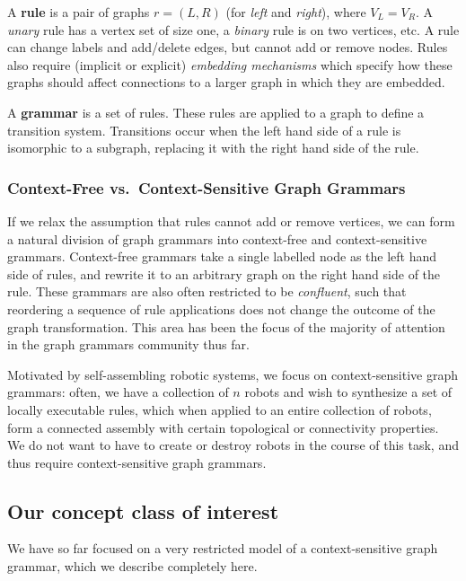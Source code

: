\documentclass[]{article}
\begin{document}
A \textbf{rule} is a pair of graphs \(r=(L,R)\) (for \emph{left} and
\emph{right}), where \(V_L = V_R\). A \emph{unary} rule has a vertex set
of size one, a \emph{binary} rule is on two vertices, etc. A rule can
change labels and add/delete edges, but cannot add or remove nodes.
Rules also require (implicit or explicit) \emph{embedding mechanisms}
which specify how these graphs should affect connections to a larger
graph in which they are embedded.

A \textbf{grammar} is a set of rules. These rules are applied
 to a graph to define a transition system. Transitions occur
when the left hand side of a rule is isomorphic to a subgraph, replacing it 
with the right hand side of the rule.

\subsubsection{Context-Free vs.~Context-Sensitive Graph
Grammars}\label{context-free-vs.context-sensitive-graph-grammars}

If we relax the assumption that rules cannot add or remove vertices, we
can form a natural division of graph grammars into context-free and
context-sensitive grammars. Context-free grammars take a single labelled
node as the left hand side of rules, and rewrite it to an arbitrary graph on
the right hand side of the rule. These grammars are also
often restricted to be \emph{confluent}, such that reordering a
sequence of rule applications does not change the outcome of the graph
transformation. This area has been the focus of the majority of
attention in the graph grammars community thus far.

Motivated by self-assembling robotic systems, we focus on context-sensitive
graph grammars: often, we have a collection of $n$ robots and wish to synthesize a
set of locally executable rules, which when applied to an entire collection of
robots, form a connected assembly with certain topological or connectivity
properties. We do not want to have to create or destroy robots in the course of
this task, and thus require context-sensitive graph grammars.

\subsection{Our concept class of
  interest}\label{our-concept-class-of-interest}

We have so far focused on a very restricted model of a context-sensitive graph
grammar, which we describe completely here.
\end{document}
